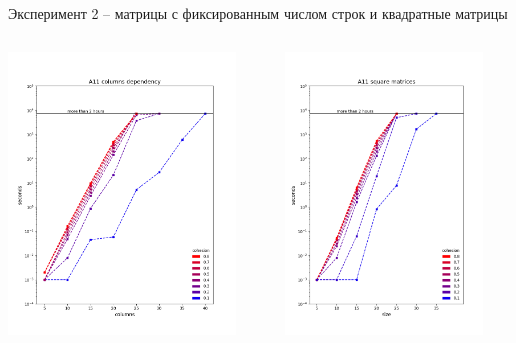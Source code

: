 \documentclass[10pt, dvipsnames]{beamer}
\begin{document}
\begin{frame}{Эксперимент 2 -- матрицы с фиксированным числом строк и квадратные матрицы}
\begin{columns}
\begin{column}{0.5\textwidth}
\includegraphics[width=\textwidth, height=7.5cm]{./images/A11-20-X.png}
\end{column}
\begin{column}{0.5\textwidth}
\includegraphics[width=\textwidth, height=7.5cm]{./images/A11-square.png}
\end{column}
\end{columns}
\end{frame}
\end{document}
